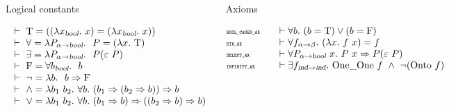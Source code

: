 \begin{frame}[fragile]
\begin{footnotesize}
\begin{columns}
\begin{block}{Logical constants}
\vspace*{-1em}
\begin{tiny}
\[
\begin{array}{l}
\ \vdash\  \mathrm{T}       =  ((\lambda x_{\textsl{bool}}.\ x) =
               (\lambda x_{\textsl{bool}}.\ x))    \\
\ \vdash\  \forall  =  \lambda P_{\alpha{\to}\textsl{bool}}.\ \ P =
                    (\lambda x.\ \mathrm{T} ) \\
\ \vdash\  \exists  =  \lambda P_{\alpha{\to}\textsl{bool}}.\ \
                    P({\varepsilon}\ P) \\
\ \vdash\  \mathrm{F}       =  \forall b_{\textsl{bool}}.\ \ b  \\
\ \vdash\  \neg    =  \lambda b.\ \ b \Rightarrow \mathrm{F} \\
\ \vdash\  {\wedge}  =  \lambda b_1\ b_2.\ \forall b.\ 
                     (b_1\Rightarrow (b_2 \Rightarrow b)) \Rightarrow b \\
\ \vdash\  {\vee}  =  \lambda b_1\ b_2.\ \forall b.\ 
                   (b_1 \Rightarrow b)\Rightarrow ((b_2 \Rightarrow b) \Rightarrow b) \\
\end{array}
\]
\end{tiny}
\end{block}
\begin{block}{Axioms}
\vspace*{-1em}
\begin{tiny}
\[
\begin{array}{@{}l@{\qquad}l}
\mbox{\tiny\tt BOOL\_CASES\_AX}&\vdash \uquant{b} (b = \T ) \vee (b = \F )\\
\mbox{\tiny\tt ETA\_AX}&
\vdash \uquant{f_{\alpha\fun\beta}}(\lquant{x}f\ x) = f\\
\mbox{\tiny\tt SELECT\_AX}&
\vdash \uquant{P_{\alpha\fun\ty{bool}}\ x} P\ x \imp
P({\hilbert}\ P)\\
\mbox{\tiny\tt INFINITY\_AX}&
\vdash \equant{f_{\ind\fun \ind}} \OneOne \ f \conj \neg(\Onto \ f)\\
\end{array}
\]
\end{tiny}
\end{block}
\end{columns}
\end{footnotesize}
\end{frame}

